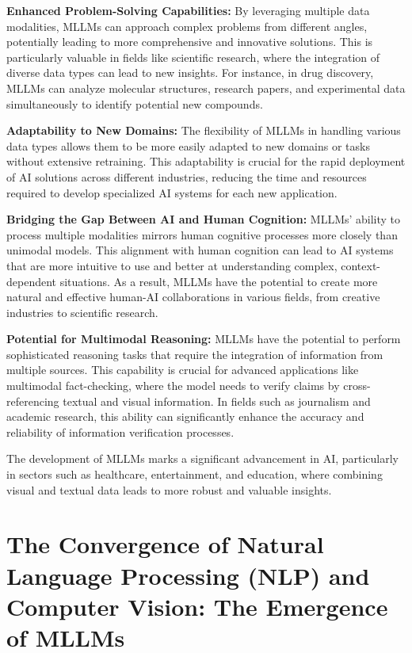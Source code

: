 \textbf{Enhanced Problem-Solving Capabilities:} By leveraging multiple data modalities, MLLMs can approach complex problems from different angles, potentially leading to more comprehensive and innovative solutions. This is particularly valuable in fields like scientific research, where the integration of diverse data types can lead to new insights. For instance, in drug discovery, MLLMs can analyze molecular structures, research papers, and experimental data simultaneously to identify potential new compounds.

\textbf{Adaptability to New Domains:} The flexibility of MLLMs in handling various data types allows them to be more easily adapted to new domains or tasks without extensive retraining. This adaptability is crucial for the rapid deployment of AI solutions across different industries, reducing the time and resources required to develop specialized AI systems for each new application.

\textbf{Bridging the Gap Between AI and Human Cognition:} MLLMs' ability to process multiple modalities mirrors human cognitive processes more closely than unimodal models. This alignment with human cognition can lead to AI systems that are more intuitive to use and better at understanding complex, context-dependent situations. As a result, MLLMs have the potential to create more natural and effective human-AI collaborations in various fields, from creative industries to scientific research.

\textbf{Potential for Multimodal Reasoning:} MLLMs have the potential to perform sophisticated reasoning tasks that require the integration of information from multiple sources. This capability is crucial for advanced applications like multimodal fact-checking, where the model needs to verify claims by cross-referencing textual and visual information. In fields such as journalism and academic research, this ability can significantly enhance the accuracy and reliability of information verification processes.


The development of MLLMs marks a significant advancement in AI, particularly in sectors such as healthcare, entertainment, and education, where combining visual and textual data leads to more robust and valuable insights.

\section{The Convergence of Natural Language Processing (NLP) and Computer Vision: The Emergence of MLLMs}

